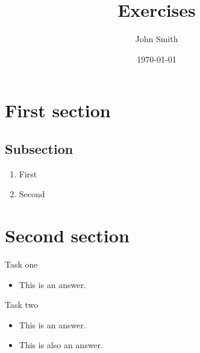 \documentclass{exercises}
\title{Exercises}
\author{John Smith}
\date{\today}
\begin{document}
\maketitle

\section{First section}

  \subsection{Subsection}

  \begin{enumerate}
    \item First
    \item Second
  \end{enumerate}

  \section{Second section}

  \begin{subtasks}
    \item Task one

      \begin{itemize}
        \item This is an answer.
      \end{itemize}

    \item Task two
      \begin{itemize}
        \item This is an answer.
        \item This is also an answer.
      \end{itemize}

  \end{subtasks}
  
\end{document}
